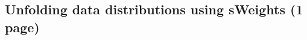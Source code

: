 
\subsection{Unfolding data distributions using sWeights (1 page)}
\label{sec:dataanalysis:selection:splot}